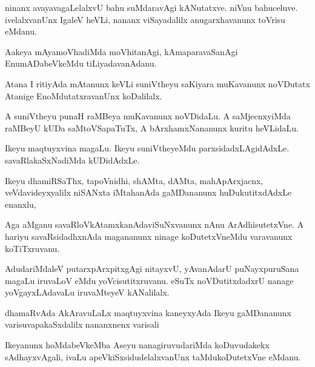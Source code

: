 \documentclass{article}
\begin{document}
\begin{mn}
ninanx avayavagaLelalxvU bahu suMdaravAgi kANutatxve.  niVnu bahuceluve.  
ivelalxvanUnx  IgaleV heVLi,  nananx viSayadalilx anugarxhavanunx toVrisu eMdanu. 
\end{mn}

\begin{mn}
Aakeya mAyamoVhadiMda moVhitanAgi, kAmaparavaSanAgi EnumADabeVkeMdu tiLiyadavanAdanu. 
\end{mn}

\begin{mn}
Atana I ritiyAda mAtanunx keVLi suniVtheyu  saKiyara muKavanunx noVDutatx 
Atanige EnoMdutatxravanUnx koDalilalx.
\end{mn}

\begin{mn}
A suniVtheyu punaH raMBeya muKavanunx noVDidaLu.  A saMjecnxyiMda raMBeyU  
kUDa saMtoVSapaTuTx,  A bArxhamxNananunx kuritu heVLidaLu.
\end{mn}

\begin{mn}
Ikeyu maqtuyxvina magaLu. Ikeyu suniVtheyeMdu parxsidadxLAgidAdxLe.  savaRlakaSxNadiMda kUDidAdxLe.
\end{mn}

\begin{mn}
Ikeyu dhamiRSaThx, tapoVnidhi, shAMta, dAMta, mahApArxjacnx, veVdavideyxyalilx 
niSANxta iMtahanAda gaMDananunx huDukutitxdAdxLe enanxlu,
\end{mn}

\begin{mn}
Aga aMganu savaRloVkAtamxkanAdaviSuNxvanunx nAnu ArAdhisutetxVne.  A hariyu 
savaRsidadhxnAda magananunx ninage koDutetxVneMdu varavanunx koTiTxruvanu.
\end{mn}

\begin{mn}
AdudariMdaleV putarxpArxpitxgAgi nitayxvU, yAvanAdarU puNayxpuruSana magaLu iruvaLoV eMdu 
yoVcisutitxruvanu. eSuTx noVDutitxdadxrU nanage yoVgayxLAdavaLu iruvaMteyeV kANalilalx.
\end{mn}

\begin{mn}
dhamaRvAda AkAravuLaLx maqtuyxvina  kaneyxyAda Ikeyu gaMDananunx varisuvapakaSxdalilx nananxnenx varisali
\end{mn}

\begin{mn}
Ikeyanunx hoMdabeVkeMba Aseyu nanagiruvudariMda koDuvudakekx sAdhayxvAgali, 
ivaLu apeVkiSxsidudelalxvanUnx taMdukoDutetxVne eMdanu.
\end{mn}
\end{document}
